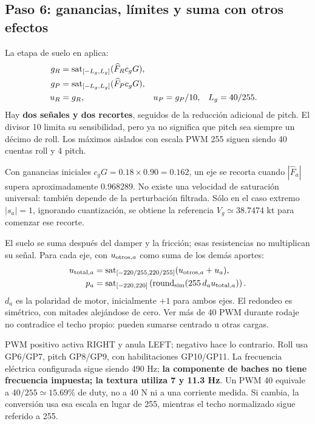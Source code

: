 \subsection{Paso 6: ganancias, límites y suma con otros efectos}
La etapa de suelo en  aplica:
\begin{align}
g_R&=\operatorname{sat}_{[-L_g,L_g]}(\widehat F_R c_g G),\\
g_P&=\operatorname{sat}_{[-L_g,L_g]}(\widehat F_P c_g G),\\
u_R&=g_R, & u_P&=g_P/10, & L_g&=40/255.
\label{eq:ground-gains}
\end{align}
Hay \textbf{dos señales y dos recortes}, seguidos de la reducción adicional de pitch. El divisor 10 limita su sensibilidad, pero ya no significa que pitch sea siempre un décimo de roll. Los máximos aislados con escala PWM 255 siguen siendo 40 cuentas roll y 4 pitch.

Con ganancias iniciales $c_gG=0.18\times0.90=0.162$, un eje se recorta cuando $|\widehat F_a|$ supera aproximadamente 0.968289. No existe una velocidad de saturación universal: también depende de la perturbación filtrada. Sólo en el caso extremo $|s_a|=1$, ignorando cuantización, se obtiene la referencia $V_g\simeq38.7474$ kt para comenzar ese recorte.

El suelo se suma después del damper y la fricción; esas resistencias no multiplican su señal. Para cada eje, con $u_{{\rm otros},a}$ como suma de los demás aportes:
\begin{align}
u_{{\rm total},a}&=\operatorname{sat}_{[-220/255,220/255]}(u_{{\rm otros},a}+u_a),\\
p_a&=\operatorname{sat}_{[-220,220]}\left(\operatorname{round}_{\rm sim}(255\,d_a u_{{\rm total},a})\right).
\end{align}
$d_a$ es la polaridad de motor, inicialmente $+1$ para ambos ejes. El redondeo es simétrico, con mitades alejándose de cero. Ver más de 40 PWM durante rodaje no contradice el techo propio: pueden sumarse centrado u otras cargas.

PWM positivo activa RIGHT y anula LEFT; negativo hace lo contrario. Roll usa GP6/GP7, pitch GP8/GP9, con habilitaciones GP10/GP11. La frecuencia eléctrica configurada sigue siendo 490 Hz; \textbf{la componente de baches no tiene frecuencia impuesta; la textura utiliza 7 y 11.3 Hz}. Un PWM 40 equivale a $40/255\simeq15.69\%$ de duty, no a 40 N ni a una corriente medida. Si  cambia, la conversión usa esa escala en lugar de 255, mientras el techo normalizado sigue referido a 255.

